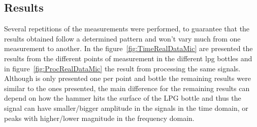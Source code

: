 \subsection{Results}
Several repetitions of the measurements were performed, to guarantee that the results obtained follow a determined pattern and won't vary much from one measurement to another. In the figure~\ref{fig:TimeRealDataMic} are presented the results from the different points of measurement in the different \acrshort{lpg} bottles and in figure~\ref{fig:ProcRealDataMic} the result from processing the same signals. Although is only presented one per point and bottle the remaining results were similar to the ones presented, the main difference for the remaining results can depend on how the hammer hits the surface of the LPG bottle and thus the signal can have smaller/bigger amplitude in the signals in the time domain, or peaks with higher/lower magnitude in the frequency domain.

